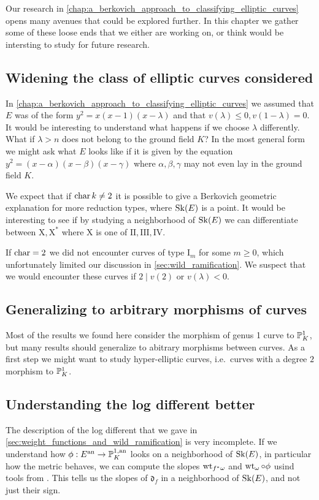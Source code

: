 Our research in \cref{chap:a_berkovich_approach_to_classifying_elliptic_curves} opens many avenues that could be explored further. 
In this chapter we gather some of these loose ends that we either are working on, or think would be intersting to study for future research. 


\subsection*{Widening the class of elliptic curves considered} \label{sec:widening_the_class_of_elliptic_curves_considered}

In \cref{chap:a_berkovich_approach_to_classifying_elliptic_curves} we assumed that $E$ was of the form $y^2 = x(x-1)(x-\lambda)$ and that $v(\lambda) \le 0, v(1-\lambda) = 0$. 
It would be interesting to understand what happens if we choose $\lambda$ differently. 
What if $\lambda > n$ does not belong to the ground field $K$?
In the most general form we might ask what $E$ looks like if it is given by the equation $y^2 = (x-\alpha)(x-\beta)(x-\gamma)$ where $\alpha, \beta, \gamma$ may not even lay in the ground field $K$. 

We expect that if $\operatorname{char} k \ne 2$ it is possible to give a Berkovich geometric explanation for more reduction types, where $\operatorname{Sk}(E)$ is a point. 
It would be interesting to see if by studying a neighborhood of $\operatorname{Sk}(E)$ we can differentiate between $\mathrm {X}, \mathrm{X}^*$ where $\mathrm {X}$ is one of  $\mathrm{II}, \mathrm{III}, \mathrm{IV}$. 

If $\operatorname{char} = 2$ we did not encounter curves of type $\mathrm I_m$ for some $m \ge 0$, which unfortunately limited our discussion in \cref{sec:wild_ramification}. 
We suspect that we would encounter these curves if $2 \mid v(2)$ or $v(\lambda) < 0$. 



\subsection*{Generalizing to arbitrary morphisms of curves} \label{sec:generalizing_to_arbitrary_morphisms_of_curves}

Most of the results we found here consider the morphism of genus 1 curve to $\mathbb{P}^{1}_K$, but many results should generalize to abitrary morphisms between curves. 
As a first step we might want to study hyper-elliptic curves, i.e.\ curves with a degree $2$ morphism to $\mathbb{P}^{1}_K$.

\subsection*{Understanding the log different better} \label{sec:understanding_the_log_different_better}
The description of the log different that we gave in \cref{sec:weight_functions_and_wild_ramification} is very incomplete. 
If we understand how $\phi: E\an \to \pro^{1, \text{an}}_K$ looks on a neighborhood of $\operatorname{Sk}(E)$, in particular how the metric behaves, we can compute the slopes $\operatorname{wt}_{f^*\omega}$ and $\wt_{\omega} \circ \phi$ usind tools from \cite{bakerWeightFunctionsBerkovich2016}. 
This tells us the slopes of $\mathfrak{d}_f $ in a neighborhood of $\operatorname{Sk}(E)$, and not just their sign. 



